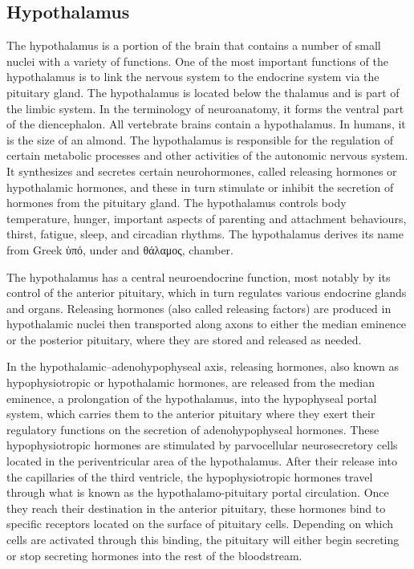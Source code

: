 \hypertarget{hypothalamus}{%
\subsection{Hypothalamus}\label{hypothalamus}}

The hypothalamus is a portion of the brain that contains a number of small nuclei with a variety of functions. One of the most important functions of the hypothalamus is to link the nervous system to the endocrine system via the pituitary gland. The hypothalamus is located below the thalamus and is part of the limbic system. In the terminology of neuroanatomy, it forms the ventral part of the diencephalon. All vertebrate brains contain a hypothalamus. In humans, it is the size of an almond. The hypothalamus is responsible for the regulation of certain metabolic processes and other activities of the autonomic nervous system. It synthesizes and secretes certain neurohormones, called releasing hormones or hypothalamic hormones, and these in turn stimulate or inhibit the secretion of hormones from the pituitary gland. The hypothalamus controls body temperature, hunger, important aspects of parenting and attachment behaviours, thirst, fatigue, sleep, and circadian rhythms. The hypothalamus derives its name from Greek ὑπό, under and θάλαμος, chamber.

The hypothalamus has a central neuroendocrine function, most notably by its control of the anterior pituitary, which in turn regulates various endocrine glands and organs. Releasing hormones (also called releasing factors) are produced in hypothalamic nuclei then transported along axons to either the median eminence or the posterior pituitary, where they are stored and released as needed.

In the hypothalamic--adenohypophyseal axis, releasing hormones, also known as hypophysiotropic or hypothalamic hormones, are released from the median eminence, a prolongation of the hypothalamus, into the hypophyseal portal system, which carries them to the anterior pituitary where they exert their regulatory functions on the secretion of adenohypophyseal hormones. These hypophysiotropic hormones are stimulated by parvocellular neurosecretory cells located in the periventricular area of the hypothalamus. After their release into the capillaries of the third ventricle, the hypophysiotropic hormones travel through what is known as the hypothalamo-pituitary portal circulation. Once they reach their destination in the anterior pituitary, these hormones bind to specific receptors located on the surface of pituitary cells. Depending on which cells are activated through this binding, the pituitary will either begin secreting or stop secreting hormones into the rest of the bloodstream.

